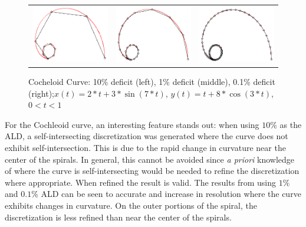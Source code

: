 \begin{figure}[h!]
  \centering
  \begin{tabular}{ccc}
  \includegraphics[width=0.3\linewidth]{Figures/cochleoid01.png} &
  \includegraphics[width=0.3\linewidth]{Figures/cochleoid001.png} &
  \includegraphics[width=0.3\linewidth]{Figures/cochleoid0001.png}
  \end{tabular}
  \caption{\label{fig:lastfigure} Cocheloid Curve: 10\% deficit (left), 1\% deficit (middle), 0.1\% deficit 
(right);\newline $x(t) = 2*t + 3*\sin(7*t)$, $y(t) = t + 8*\cos(3*t)$, $0<t<1$}
  \end{figure}

For the Cochleoid curve, an interesting feature stands out: when using 
$10\%$ as the ALD, a self-intersecting discretization was generated where 
the curve does not exhibit self-intersection. This is due to the rapid 
change in curvature near the center of the spirals.  In general, this 
cannot be avoided since {\it a priori} knowledge of where the curve is 
self-intersecting would be needed to refine the discretization where 
appropriate. When refined the result is valid. The results from using $1\%$ and $0.1\%$ ALD can be seen to accurate and increase in resolution where the curve exhibits changes in curvature. On the outer portions of the spiral, the discretization is less refined than near the center of the spirals.

